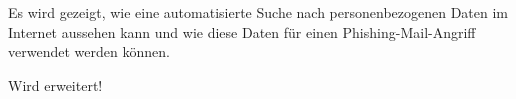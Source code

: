 \label{cha:kurzfassung} 
Es wird gezeigt, wie eine automatisierte Suche nach personenbezogenen Daten im Internet aussehen kann und wie diese Daten für einen Phishing-Mail-Angriff verwendet werden können. 

Wird erweitert!




